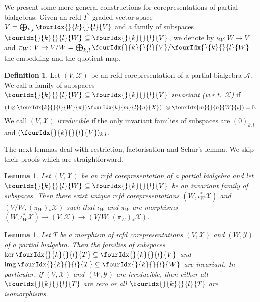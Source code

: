 \documentclass[10pt]{article}
\DeclareMathOperator{\img}{img}
\newcommand{\Gr}[5]{\fourIdx{#2}{#4}{#3}{#5}{#1}}%
\newcommand{\Gru}[3]{\Gr{#1}{}{}{#2}{#3}}
\newtheorem{Lem}[Theorem]{Lemma}
\theoremstyle{definition}
\newtheorem{Def}[Theorem]{Definition}
\numberwithin{equation}{section}
\begin{document}
We present some more general constructions for corepresentations of partial bialgebras. Given an rcfd $I^{2}$-graded vector space $V=\bigoplus_{k,l} \Gru{V}{k}{l}$
and a family of subspaces $\Gru{W}{k}{l} \subseteq \Gru{V}{k}{l}$, we
denote by $\iota_{W}\colon W\to V$ and $\pi_{W} \colon V \to
V/W=\bigoplus_{k,l} \Gru{V}{k}{l}/\Gru{W}{k}{l}$ the embedding and the
quotient map.
\begin{Def} Let $(V,\mathscr{X})$ be an rcfd
  corepresentation of a partial bialgebra $\mathscr{A}$.  We call a
  family of subspaces $\Gru{W}{k}{l} \subseteq \Gru{V}{k}{l}$
  \emph{invariant (w.r.t.\ $\mathscr{X}$)} if
 \begin{align} \label{eq:rep-invariant} (1\otimes
   \Gr{\pi}{k}{l}{}{W})\Gr{X}{k}{l}{m}{n}(1 \otimes
   \Gr{\iota}{m}{n}{}{W}) =0.
  \end{align}
We call $(V,\mathscr{X})$ 
 \emph{irreducible} if the only invariant families of subspaces are
 $(0)_{k,l}$ and $(\Gru{V}{k}{l})_{k,l}$.
\end{Def}

The next lemmas deal with restriction, factorisation and Schur's lemma. We skip their proofs which are straightforward.

\begin{Lem}
  Let $(V,\mathscr{X})$ be an rcfd corepresentation
  of a partial bialgebra and let $\Gru{W}{k}{l}
  \subseteq \Gru{V}{k}{l}$ be an invariant family of subspaces. Then
  there exist unique rcfd corepresentations
  $(W,\iota_{W}^{*}\mathscr{X})$ and $(V/W,(\pi_{W})_{*}\mathscr{X})$ 
  such that $\iota_{W}$  and  $\pi_{W}$  are  morphisms  $(W,\iota_{W}^{*}\mathscr{X}) \to (V,\mathscr{X}) \to (V/W,(\pi_{W})_{*}\mathscr{X})$.
\end{Lem}

\begin{Lem} Let $T$ be a morphism of rcfd
  corepresentations $(V,\mathscr{X})$ and $(W,\mathscr{Y})$ of a
  partial bialgebra. Then the families of subspaces $\ker
  \Gru{T}{k}{l} \subseteq \Gru{V}{k}{l}$ and $\img\Gru{T}{k}{l}
  \subseteq \Gru{W}{k}{l}$ are invariant.  In particular, if
  $(V,\mathscr{X})$ and $(W,\mathscr{Y})$ are irreducible, then either
  all $\Gru{T}{k}{l}$ are zero or all $\Gru{T}{k}{l}$ are
  isomorphisms.
\end{Lem} 
\end{document}
